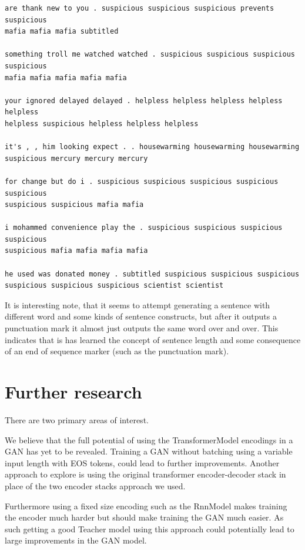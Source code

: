 \documentclass{article}
\begin{document}
\begin{verbatim}
are thank new to you . suspicious suspicious suspicious prevents suspicious
mafia mafia mafia subtitled

something troll me watched watched . suspicious suspicious suspicious suspicious
mafia mafia mafia mafia mafia

your ignored delayed delayed . helpless helpless helpless helpless helpless
helpless suspicious helpless helpless helpless

it's , , him looking expect . . housewarming housewarming housewarming
suspicious mercury mercury mercury

for change but do i . suspicious suspicious suspicious suspicious suspicious
suspicious suspicious mafia mafia

i mohammed convenience play the . suspicious suspicious suspicious suspicious
suspicious mafia mafia mafia mafia

he used was donated money . subtitled suspicious suspicious suspicious
suspicious suspicious suspicious scientist scientist
\end{verbatim}

It is interesting note, that it seems to attempt generating a sentence with
different word and some kinds of sentence constructs, but after it outputs a
punctuation mark it almost just outputs the same word over and over. This
indicates that is has learned the concept of sentence length and some
consequence of an end of sequence marker (such as the punctuation mark).


\section{Further research}\label{sec:furtherResearch}
There are two primary areas of interest.

We believe that the full potential of using the TransformerModel encodings
in a GAN has yet to be revealed. Training a GAN without batching using a variable
input length with EOS tokens, could lead to further improvements. Another approach
to explore is using the original transformer encoder-decoder stack in place of the two encoder stacks approach we used.

Furthermore using a fixed size encoding such as the RnnModel makes training the encoder much harder
but should make training the GAN much easier. As such getting a good Teacher model using this
approach could potentially lead to large improvements in the GAN model.
\end{document}
